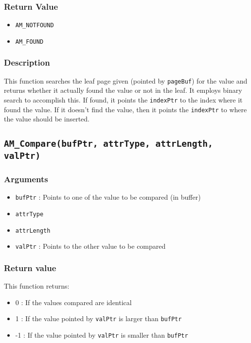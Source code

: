 \documentclass[a4paper, 12pt]{article}
\begin{document}
\subsubsection{Return Value}
\begin{itemize}
	\item{\texttt{AM\_NOTFOUND}}
	\item{\texttt{AM\_FOUND}}
\end{itemize}
\subsubsection{Description}
This function searches the leaf page given (pointed by \texttt{pageBuf}) for the value and returns whether it actually found the value or not in the leaf. It employs binary search to accomplish this. If found, it points the \texttt{indexPtr} to the index where it found the value. If it doesn't find the value, then it points the \texttt{indexPtr} to where the value should be inserted.

\subsection{\texttt{AM\_Compare(bufPtr, attrType, attrLength, valPtr)}}
\subsubsection{Arguments}
\begin{itemize}
	\item{\texttt{bufPtr} : Points to one of the value to be compared (in buffer)}
	\item{\texttt{attrType}}
	\item{\texttt{attrLength}}
	\item{\texttt{valPtr} : Points to the other value to be compared}
\end{itemize}
\subsubsection{Return value}
This function returns:
\begin{itemize}
	\item{0 : If the values compared are identical}
	\item{1 : If the value pointed by \texttt{valPtr} is larger than \texttt{bufPtr}}
	\item{-1 : If the value pointed by \texttt{valPtr} is smaller than \texttt{bufPtr}}
\end{itemize}
\end{document}
